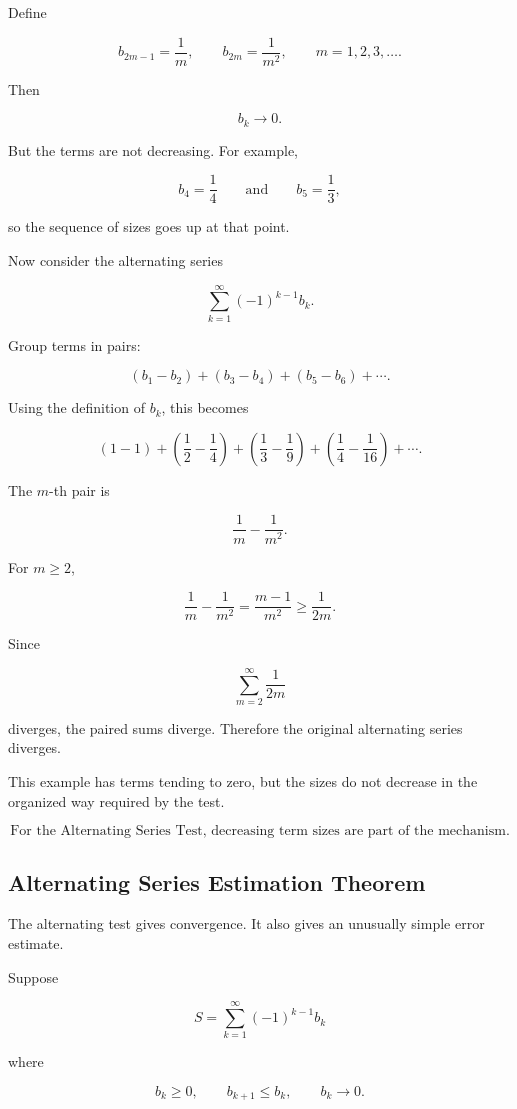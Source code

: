 Define

\[
b_{2m-1}=\frac1m,
\qquad
b_{2m}=\frac1{m^2},
\qquad m=1,2,3,\ldots.
\]

Then

\[
b_k\to0.
\]

But the terms are not decreasing.  For example,

\[
b_4=\frac14
\qquad\text{and}\qquad
b_5=\frac13,
\]

so the sequence of sizes goes up at that point.

Now consider the alternating series

\[
\sum_{k=1}^{\infty}(-1)^{k-1}b_k.
\]

Group terms in pairs:

\[
(b_1-b_2)+(b_3-b_4)+(b_5-b_6)+\cdots.
\]

Using the definition of \(b_k\), this becomes

\[
\left(1-1\right)
+
\left(\frac12-\frac14\right)
+
\left(\frac13-\frac19\right)
+
\left(\frac14-\frac1{16}\right)
+\cdots.
\]

The \(m\)-th pair is

\[
\frac1m-\frac1{m^2}.
\]

For \(m\ge2\),

\[
\frac1m-\frac1{m^2}
=
\frac{m-1}{m^2}
\ge
\frac1{2m}.
\]

Since

\[
\sum_{m=2}^{\infty}\frac1{2m}
\]

diverges, the paired sums diverge.  Therefore the original alternating series diverges.

This example has terms tending to zero, but the sizes do not decrease in the organized
way required by the test.

\[
\boxed{
\text{For the Alternating Series Test, decreasing term sizes are part of the mechanism.}
}
\]

\subsection{Alternating Series Estimation Theorem}
\label{subsec:alternating-series-estimation}

The alternating test gives convergence.  It also gives an unusually simple error estimate.

Suppose

\[
S=\sum_{k=1}^{\infty}(-1)^{k-1}b_k
\]

where

\[
b_k\ge0,
\qquad
b_{k+1}\le b_k,
\qquad
b_k\to0.
\]

